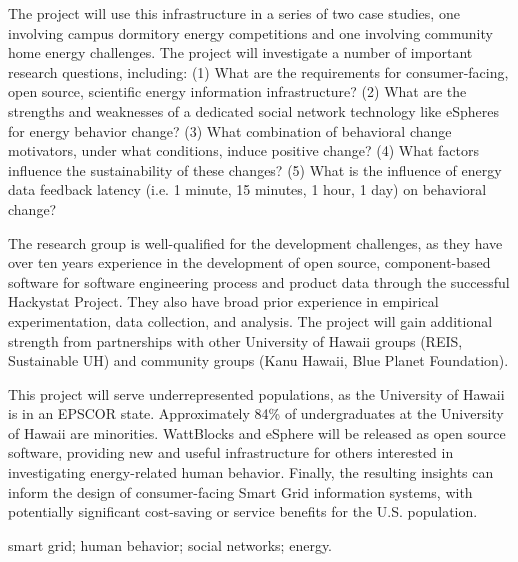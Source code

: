 \documentclass{proposalnsf}
\begin{document}
The project will use this infrastructure in a series of two case studies, one
involving campus dormitory energy competitions and one involving community
home energy challenges.  The project will investigate a number of
important research questions, including: (1) What are the requirements
for consumer-facing, open source, scientific energy information
infrastructure? (2) What are the strengths and weaknesses of a dedicated
social network technology like eSpheres for energy behavior change? (3)
What combination of behavioral change motivators, under what conditions,
induce positive change? (4) What factors influence the sustainability of
these changes? (5) What is the influence of energy data feedback latency
(i.e. 1 minute, 15 minutes, 1 hour, 1 day) on behavioral change? 

The research group is well-qualified for the development challenges, as
they have over ten years experience in the development of open source,
component-based software for software engineering process and product data
through the successful Hackystat Project.  They also have broad prior experience
in empirical experimentation, data collection, and analysis.  The project will
gain additional strength from partnerships with other University of Hawaii
groups (REIS, Sustainable UH) and community groups (Kanu Hawaii, Blue
Planet Foundation).

\medskip 

This project will serve underrepresented populations, as the University of
Hawaii is in an EPSCOR state. Approximately 84\% of undergraduates at the
University of Hawaii are minorities. WattBlocks and eSphere will be
released as open source software, providing new and useful infrastructure
for others interested in investigating energy-related human behavior.
Finally, the resulting insights can inform the design of consumer-facing
Smart Grid information systems, with potentially significant cost-saving or
service benefits for the U.S. population.

\medskip

 smart grid; human behavior; social networks;
energy.
\end{document}
